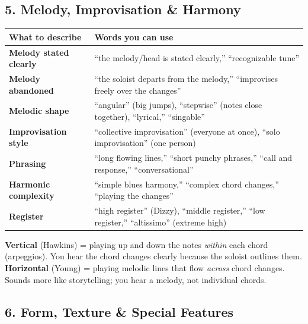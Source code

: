 \documentclass[11pt,letterpaper]{article}
\begin{document}
\subsection{5. Melody, Improvisation \& Harmony}

\begin{small}
\begin{tabularx}{\textwidth}{>{\bfseries}p{3cm} X}
\toprule
\textbf{What to describe} & \textbf{Words you can use} \\
\midrule
Melody stated clearly & ``the melody/head is stated clearly,'' ``recognizable tune'' \\
Melody abandoned & ``the soloist departs from the melody,'' ``improvises freely over the changes'' \\
Melodic shape & ``angular'' (big jumps), ``stepwise'' (notes close together), ``lyrical,'' ``singable'' \\
Improvisation style & ``collective improvisation'' (everyone at once), ``solo improvisation'' (one person) \\
Phrasing & ``long flowing lines,'' ``short punchy phrases,'' ``call and response,'' ``conversational'' \\
Harmonic complexity & ``simple blues harmony,'' ``complex chord changes,'' ``playing the changes'' \\
Register & ``high register'' (Dizzy), ``middle register,'' ``low register,'' ``altissimo'' (extreme high) \\
\bottomrule
\end{tabularx}
\end{small}

\begin{tcolorbox}[examplebox, title={Vertical vs. Horizontal (a key distinction)}]
\textbf{Vertical} (Hawkins) = playing up and down the notes \emph{within} each chord (arpeggios). You hear the chord changes clearly because the soloist outlines them.\\[0.3em]
\textbf{Horizontal} (Young) = playing melodic lines that flow \emph{across} chord changes. Sounds more like storytelling; you hear a melody, not individual chords.
\end{tcolorbox}

\subsection{6. Form, Texture \& Special Features}
\end{document}

